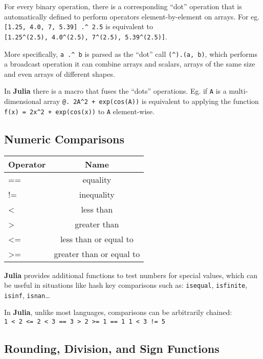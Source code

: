 \documentclass[
]{article}
\begin{document}
For every binary operation, there is a corresponding ``dot'' operation
that is automatically defined to perform operators element-by-element on
arrays. For eg. \texttt{{[}1.25,\ 4.0,\ 7,\ 5.39{]}\ .\^{}\ 2.5} is
equivalent to
\texttt{{[}1.25\^{}(2.5),\ 4.0\^{}(2.5),\ 7\^{}(2.5),\ 5.39\^{}(2.5){]}}.

More specifically, \texttt{a\ .\^{}\ b} is parsed as the ``dot'' call
\texttt{(\^{}).(a,\ b)}, which performs a broadcast operation it can
combine arrays and scalars, arrays of the same size and even arrays of
different shapes.

In \textbf{Julia} there is a macro that fuses the ``dots'' operations.
Eg. if \texttt{A} is a multi-dimensional array
\texttt{@.\ 2A\^{}2\ +\ exp(cos(A))} is equivalent to applying the
function \texttt{f(x)\ =\ 2x\^{}2\ +\ exp(cos(x))} to \texttt{A}
element-wise.

\hypertarget{numeric-comparisons}{%
\subsection{Numeric Comparisons}\label{numeric-comparisons}}

\begin{longtable}[]{@{}lc@{}}
\toprule\noalign{}
Operator & Name \\
\midrule\noalign{}
\endhead
\bottomrule\noalign{}
\endlastfoot
== & equality \\
!= & inequality \\
\textless{} & less than \\
\textgreater{} & greater than \\
\textless= & less than or equal to \\
\textgreater= & greater than or equal to \\
\end{longtable}

\textbf{Julia} provides additional functions to test numbers for special
values, which can be useful in situations like hash key comparisons such
as: \texttt{isequal}, \texttt{isfinite}, \texttt{isinf},
\texttt{isnan}\ldots{}

In \textbf{Julia}, unlike most languages, comparisons can be arbitrarily
chained:
\texttt{1\ \textless{}\ 2\ \textless{}=\ 2\ \textless{}\ 3\ ==\ 3\ \textgreater{}\ 2\ \textgreater{}=\ 1\ ==\ 1\ 1\ \textless{}\ 3\ !=\ 5}

\hypertarget{rounding-division-and-sign-functions}{%
\subsection{Rounding, Division, and Sign
Functions}\label{rounding-division-and-sign-functions}}
\end{document}
